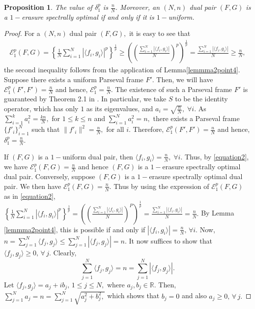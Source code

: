 \documentclass[final,1p,times]{elsarticle}
\newtheorem{prop}[thm]{Proposition}
\begin{document}
	\begin{prop}\label{prop3point1}
		The  value of $ \delta_{1}^p$ is $\frac{n}{N}$. Moreover, an $(N,n)$ dual pair $(F,G) $ is a $1-$erasure spectrally optimal  if and only if it is $1-$uniform.
	\end{prop}
	\begin{proof}
For a $(N,n)$ dual pair $(F,G),$ it is easy to see that 
\begin{align}\label{eqn3point3}
    \mathcal{E}_{1}^p (F,G) = \left\{\frac{1}{N} \sum\limits_{i=1}^N \left|\langle f_i, g_i \rangle \right|^p\right\}^{\frac{1}{p}} \geq \left( \left(\frac{\sum\limits_{i=1}^N \left|\langle f_i, g_i \rangle \right|}{N}   \right)^p \right)^{\frac{1}{p}} = \frac{\sum \limits_{i=1}^N\left|\langle f_i, g_i \rangle \right|}{N} \geq \frac{n}{N},
\end{align}
the second inequality follows from the application of Lemma\ref{lemmma2point4}.
 Suppose there exists a uniform Parseval frame $F'$. Then, we will have  $\mathcal{E}_{1}^p (F',F') = \frac{n}{N} $ and hence, $ \mathcal{E}_{1}^p  = \frac{n}{N}.$ The existence of such a Parseval frame $F'$  is guaranteed by Theorem 2.1 in \cite{casa2}. In particular, we take $S$ to be the identity operator, which has only $1$ as its eigenvalues, and $a_i = \sqrt{\frac{n}{N}}, \; \forall i.$ As $\sum\limits_{i=1}^k a_{i}^2 = \frac{kn}{N},$ for $ 1\leq k \leq n$ and  $\sum\limits_{i=1}^N a_{i}^2 = n,$ there exists a Parseval frame $\{f'_i\}_{i=1}^N$ such that $\| f'_i\|^2 = \frac{n}{N},$ for all $i.$ Therefore, $\mathcal{E}_{1}^p (F',F') = \frac{n}{N}$ and hence, 
$\delta_{1}^p = \frac{n}{N}.$ 
\par If $(F,G)$ is a $1-$uniform dual pair, then $\langle f_i, g_i \rangle = \frac{n}{N},\;\forall i. $ Thus, by \eqref{equation2}, we have $\mathcal{E}_{1}^p (F,G) = \frac{n}{N}$ and hence $(F,G) $  is a $1-$erasure spectrally optimal dual pair. Conversely, suppose  $(F,G) $  is a $1-$erasure spectrally optimal dual pair. We then have $\mathcal{E}_{1}^p (F,G) = \frac{n}{N} .$ Thus by using the expression of $\mathcal{E}_{1}^p (F,G)$ as in \eqref{equation2}, $\left\{\frac{1}{N} \sum\limits_{i=1}^N \left|\langle f_i, g_i \rangle \right|^p\right\}^{\frac{1}{p}} = \left( \left(\frac{\sum\limits_{i=1}^N \left|\langle f_i, g_i \rangle \right|}{N}   \right)^P \right)^{\frac{1}{p}} = \frac{\sum\limits_{i=1}^N \left|\langle f_i, g_i \rangle \right|}{N} = \frac{n}{N}.$ By Lemma \ref{lemmma2point4}, this is possible if and only if $\left|\langle f_i, g_i \rangle \right| =  \frac{n}{N},\,\forall i.$
 Now, $ n = \displaystyle{\sum_{j=1}^N \langle f_j , g_j \rangle \leq \sum_{j=1}^N |\langle f_j , g_j \rangle |  = n } .$  It now suffices to show that $\langle f_j, g_j \rangle \geq 0,\,\forall\, j.$ Clearly,
			$$\sum\limits_{j=1}^N \langle f_j , g_j \rangle = n =  \sum\limits_{j=1}^N |\langle f_j , g_j \rangle | .$$
			Let $\langle f_j , g_j \rangle = a_j + ib_j,\, 1\leq j \leq N,$ where $a_j,b_j \in \mathbb{R}.$ Then, $\sum\limits_{j=1}^N a_j = n = \sum\limits_{j=1}^N \sqrt{a_j^2 +b_j^2,}$ which shows that $b_j = 0$  and also $a_j \geq 0,\, \forall\, j.$
\end{proof}
\end{document}
